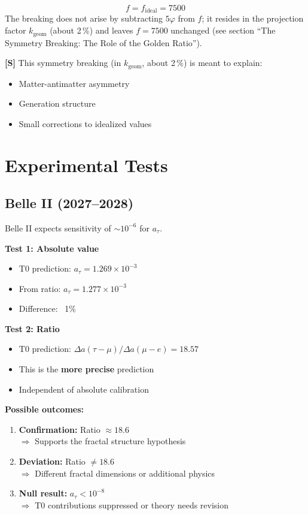 	\begin{equation}
		f = f_{\text{ideal}} = 7500
	\end{equation}
	The breaking does not arise by subtracting $5\varphi$ from $f$; it resides in the projection factor $k_\text{geom}$ (about 2\,\%) and leaves $f = 7500$ unchanged (see section \enquote{The Symmetry Breaking: The Role of the Golden Ratio}).
	
	\textbf{[S]} This symmetry breaking (in $k_\text{geom}$, about 2\,\%) is meant to explain:
	\begin{itemize}
		\item Matter-antimatter asymmetry
		\item Generation structure
		\item Small corrections to idealized values
	\end{itemize}
	
	\section{Experimental Tests}
	
	\subsection{Belle II (2027--2028)}
	
	Belle II expects sensitivity of $\sim 10^{-6}$ for $a_\tau$.
	
	\textbf{Test 1: Absolute value}
	\begin{itemize}
		\item T0 prediction: $a_\tau = 1.269 \times 10^{-3}$
		\item From ratio: $a_\tau = 1.277 \times 10^{-3}$
		\item Difference: ~1\%
	\end{itemize}
	
	\textbf{Test 2: Ratio}
	\begin{itemize}
		\item T0 prediction: $\Delta a(\tau - \mu) / \Delta a(\mu - e) = 18.57$
		\item This is the \textbf{more precise} prediction
		\item Independent of absolute calibration
	\end{itemize}
	
	\textbf{Possible outcomes:}
	\begin{enumerate}
		\item \textbf{Confirmation:} Ratio $\approx 18.6$ \\
		$\Rightarrow$ Supports the fractal structure hypothesis
		
		\item \textbf{Deviation:} Ratio $\neq 18.6$ \\
		$\Rightarrow$ Different fractal dimensions or additional physics
		
		\item \textbf{Null result:} $a_\tau < 10^{-8}$ \\
		$\Rightarrow$ T0 contributions suppressed or theory needs revision
	\end{enumerate}
	
